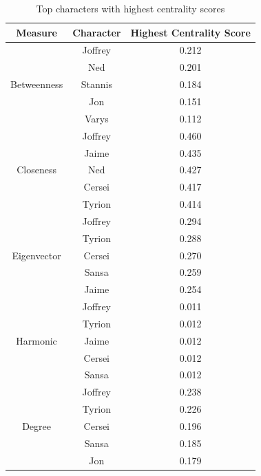 \documentclass[10pt,twocolumn,letterpaper]{article}
\begin{document}
\begin{table}[!h]
    \centering
    \small
    \begin{tabular}{c|c|c}
        Measure & Character & \small{Highest Centrality Score} \\
        \hline
                    & Joffrey & 0.212 \\
                    & Ned & 0.201 \\
        Betweenness & Stannis & 0.184 \\
                    & Jon & 0.151 \\
                    & Varys & 0.112 \\
        \hline 
                    & Joffrey & 0.460 \\
                    & Jaime & 0.435 \\
        Closeness   & Ned & 0.427 \\
                    & Cersei & 0.417 \\
                    & Tyrion & 0.414 \\
        \hline 
                    & Joffrey & 0.294 \\
                    & Tyrion & 0.288 \\
        Eigenvector & Cersei & 0.270 \\
                    & Sansa & 0.259 \\
                    & Jaime & 0.254 \\
        \hline 
                    & Joffrey & 0.011 \\
                    & Tyrion & 0.012 \\
        Harmonic    & Jaime & 0.012 \\
                    & Cersei & 0.012 \\
                    & Sansa & 0.012 \\
        \hline
                    & Joffrey & 0.238 \\
                    & Tyrion & 0.226 \\
        Degree      & Cersei & 0.196 \\
                    & Sansa & 0.185 \\
                    & Jon & 0.179 \\
        \hline
    \end{tabular}
    \vspace{0.2cm}
    \caption{Top characters with highest centrality scores}
    \label{tab:my_label}
\end{table}
\end{document}
